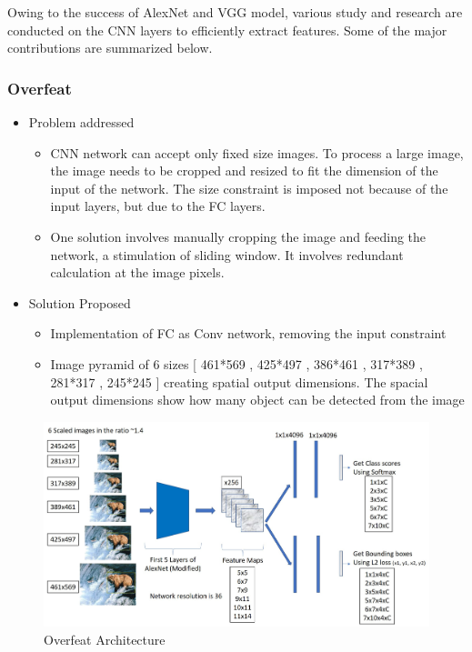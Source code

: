 Owing to the success of AlexNet and VGG model, various study and research are conducted on the CNN layers to efficiently extract features. Some of the major contributions are summarized below.

\subsubsection{Overfeat}
\begin{itemize}
	\item Problem addressed
		\begin{itemize}
			\item CNN network can accept only fixed size images. To process a large image, the image needs to be cropped and resized to fit the dimension of the input of the network. The size constraint is imposed not because of the input layers, but due to the FC layers.
			\item One solution involves manually cropping the image and feeding the network, a stimulation of sliding window. It involves redundant calculation at the image pixels.
		\end{itemize}
	\item Solution Proposed
		\begin{itemize}
			\item Implementation of FC as Conv network, removing the input constraint
			\item Image pyramid of 6 sizes [ 461*569 , 425*497 , 386*461 , 317*389 , 281*317 , 245*245 ] creating spatial output dimensions. The spacial output dimensions show how many object can be detected from the image
		\end{itemize}
\end{itemize}

\begin{figure}[h!]
	\centering
	\includegraphics[width=0.9\linewidth]{Images/overfeat}
	\caption{Overfeat Architecture}
\end{figure}

